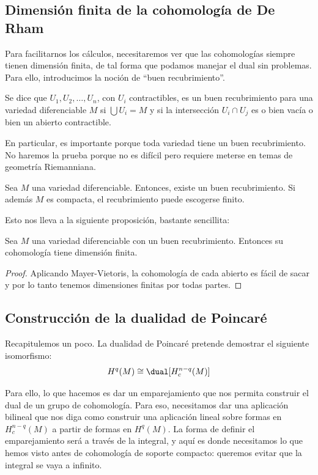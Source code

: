\documentclass[palatino, bibnumbers]{apuntes}
\begin{document}
\subsection{Dimensión finita de la cohomología de De Rham}

Para facilitarnos los cálculos, necesitaremos ver que las cohomologías siempre tienen dimensión finita, de tal forma que podamos manejar el dual sin problemas. Para ello, introducimos la noción de ``buen recubrimiento''.

\begin{defn} \label{def:BuenRecubrimiento}
Se dice que $U_1,U_2,\dotsc,U_n$, con $U_i$ contractibles, es un buen recubrimiento para una variedad diferenciable $M$ si $\bigcup U_i = M$ y si la intersección $U_i ∩ U_j$ es o bien vacía o bien un abierto contractible.
\end{defn}

En particular, es importante porque toda variedad tiene un buen recubrimiento. No haremos la prueba porque no es difícil pero requiere meterse en temas de geometría Riemanniana.

\begin{theorem} Sea $M$ una variedad diferenciable. Entonces, existe un buen recubrimiento. Si además $M$ es compacta, el recubrimiento puede escogerse finito.
\end{theorem}

Esto nos lleva a la siguiente proposición, bastante sencillita:

\begin{prop}\label{prop:CohomologiaFinita} Sea $M$ una variedad diferenciable con un buen recubrimiento. Entonces su cohomología tiene dimensión finita.
\end{prop}

\begin{proof} Aplicando Mayer-Vietoris, la cohomología de cada abierto es fácil de sacar y por lo tanto tenemos dimensiones finitas por todas partes.
\end{proof}

\subsection{Construcción de la dualidad de Poincaré}

Recapitulemos un poco. La dualidad de Poincaré pretende demostrar el siguiente isomorfismo: \[ H^q(M) \cong \dual[H_c^{n-q}(M)]\]

Para ello, lo que hacemos es dar un emparejamiento que nos permita construir el dual de un grupo de cohomología. Para eso, necesitamos dar una aplicación bilineal que nos diga como construir una aplicación lineal sobre formas en $H_c^{n-q}(M)$ a partir de formas en $H^q(M)$. La forma de definir el emparejamiento será a través de la integral, y aquí es donde necesitamos lo que hemos visto antes de cohomología de soporte compacto: queremos evitar que la integral se vaya a infinito.
\end{document}

